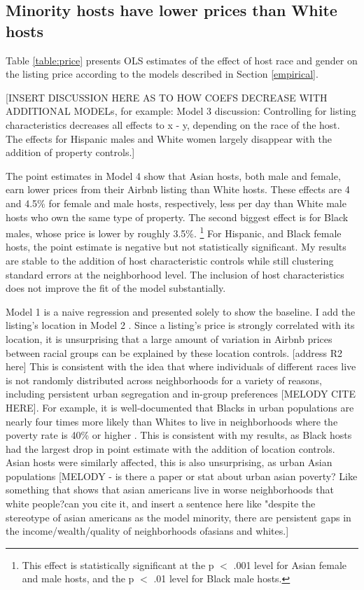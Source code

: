\subsection*{Minority hosts have lower prices than White hosts} 
	\label{result1}
	

Table \ref{table:price} presents OLS estimates of the effect of host race and gender on the listing price according to the models described in Section \ref{empirical}. 

[INSERT DISCUSSION HERE AS TO HOW COEFS DECREASE WITH ADDITIONAL MODELs, for example: Model 3 discussion: Controlling for listing characteristics decreases all effects to x - y, depending on the race of the host. The effects for Hispanic males and White women largely disappear with the addition of property controls.]

The point estimates in Model 4 show that Asian hosts, both male and female, earn lower prices from their Airbnb listing than White hosts. These effects are 4 and 4.5\% for female and male hosts, respectively, less per day than White male hosts who own the same type of property. The second biggest effect is for Black males, whose price is lower by roughly 3.5\%.%
	\footnote{This effect is statistically significant at the p $<$ .001 level for Asian female and male hosts, and the p $<$ .01 level for Black male hosts.} 
For Hispanic, and Black female hosts, the point estimate is negative but not statistically significant. My results are stable to the addition of host characteristic controls while still clustering standard errors at the neighborhood level. The inclusion of host characteristics does not improve the fit of the model substantially.  

Model 1 is a naive regression and presented solely to show the baseline. I add the listing's location in Model 2 . Since a listing's price is strongly correlated with its location, it is unsurprising that a large amount of variation in Airbnb prices between racial groups can be explained by these location controls. [address R2 here]
This is consistent with the idea that where individuals of different races live is not randomly distributed across neighborhoods for a variety of reasons, including persistent urban segregation and in-group preferences [MELODY CITE HERE]. For example, it is well-documented that Blacks in urban populations are nearly four times more likely than Whites to live in neighborhoods where the poverty rate is 40\% or higher \citep{firebaugh}. This is consistent with my results, as Black hosts had the largest drop in point estimate with the addition of location controls. Asian hosts were similarly affected, this is also unsurprising, as urban Asian populations [MELODY - is there a paper or stat about urban asian poverty? Like something that shows that asian americans live in worse neighborhoods that white people?can you cite  it, and insert a sentence here  like "despite the stereotype of asian americans as the model  minority, there are persistent gaps in the income/wealth/quality of neighborhoods ofasians and whites.]


